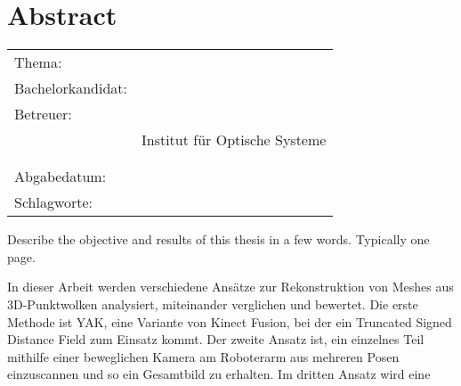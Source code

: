 \thispagestyle{plain}
\chapter*{Abstract}
\label{ch:abstract}


\begin{center}
	\begin{tabular}{p{3.2cm}p{9.6cm}}
		Thema: & \thema \\[1ex]
		Bachelorkandidat: & \autor \\[1ex]
		Betreuer: & \prueferA \\%
		 & Institut für Optische Systeme\\[1ex]
		 & \prueferB \\%
		 & \firma \\[1ex]
		Abgabedatum: & \abgabedatum \\[1ex]
		Schlagworte: & \schlagworte \\
	\end{tabular}
\end{center}


Describe the objective and results of this thesis in a few words.
Typically one page.

In dieser Arbeit werden verschiedene Ansätze zur Rekonstruktion von Meshes aus 3D-Punktwolken analysiert, miteinander verglichen und bewertet.
Die erste Methode ist YAK, eine Variante von Kinect Fusion, bei der ein Truncated Signed Distance Field zum Einsatz kommt.
Der zweite Ansatz ist, ein einzelnes Teil mithilfe einer beweglichen Kamera am Roboterarm aus mehreren Posen einzuscannen und so ein Gesamtbild zu erhalten.
Im dritten Ansatz wird eine 

\newpage
